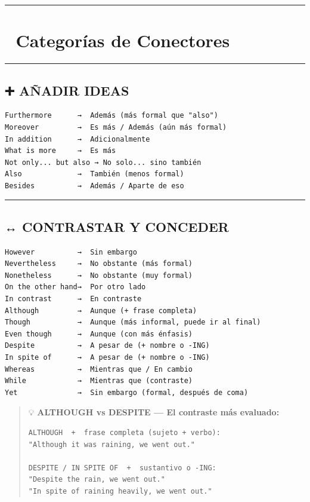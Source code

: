 \documentclass[
  spanish,
  letterpaper,
]{scrbook}
\begin{document}
\begin{center}\rule{0.5\linewidth}{0.5pt}\end{center}

\section{📐 Categorías de Conectores}\label{categoruxedas-de-conectores}

\begin{center}\rule{0.5\linewidth}{0.5pt}\end{center}

\subsection{➕ AÑADIR IDEAS}\label{auxf1adir-ideas}

\begin{verbatim}
Furthermore      →  Además (más formal que "also")
Moreover         →  Es más / Además (aún más formal)
In addition      →  Adicionalmente
What is more     →  Es más
Not only... but also → No solo... sino también
Also             →  También (menos formal)
Besides          →  Además / Aparte de eso
\end{verbatim}

\begin{center}\rule{0.5\linewidth}{0.5pt}\end{center}

\subsection{↔️ CONTRASTAR Y CONCEDER}\label{contrastar-y-conceder}

\begin{verbatim}
However          →  Sin embargo
Nevertheless     →  No obstante (más formal)
Nonetheless      →  No obstante (muy formal)
On the other hand→  Por otro lado
In contrast      →  En contraste
Although         →  Aunque (+ frase completa)
Though           →  Aunque (más informal, puede ir al final)
Even though      →  Aunque (con más énfasis)
Despite          →  A pesar de (+ nombre o -ING)
In spite of      →  A pesar de (+ nombre o -ING)
Whereas          →  Mientras que / En cambio
While            →  Mientras que (contraste)
Yet              →  Sin embargo (formal, después de coma)
\end{verbatim}

\begin{quote}
💡 \textbf{ALTHOUGH vs DESPITE --- El contraste más evaluado:}

\begin{verbatim}
ALTHOUGH  +  frase completa (sujeto + verbo):
"Although it was raining, we went out."

DESPITE / IN SPITE OF  +  sustantivo o -ING:
"Despite the rain, we went out."
"In spite of raining heavily, we went out."
\end{verbatim}
\end{quote}
\end{document}
